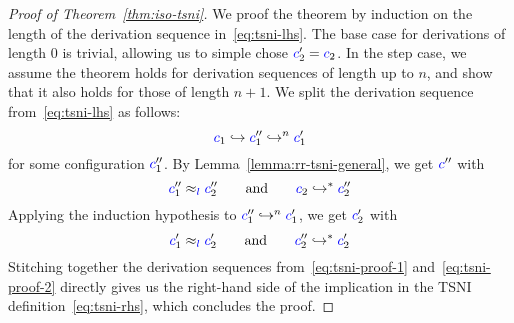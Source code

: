 \documentclass{sigplanconf}
\begin{document}
\begin{proof}[Proof of Theorem~\ref{thm:iso-tsni}]
  We proof the theorem by induction on the length of the derivation sequence in~\eqref{eq:tsni-lhs}.
  The base case for derivations
  of length 0 is trivial, allowing
  us to simple chose ${\color{blue} c}_{2}'\mathrel{=}{\color{blue} c}_{2}$.  In the step case, we assume
  the theorem holds for derivation sequences of length up to $n$, and show that it also
  holds for those of length $n+1$.  We split the derivation sequence from~\eqref{eq:tsni-lhs} as follows:
  \[
  {\color{blue} c}_{1} \hookrightarrow {\color{blue} c}_{1}'' \hookrightarrow^n {\color{blue} c}_{1}'
  \]
  for some configuration \ensuremath{\ifc{c}_{1}''}.  By Lemma~\ref{lemma:rr-tsni-general}, we get
  \ensuremath{\ifc{c}''} with
  \begin{equation} \label{eq:tsni-proof-1}
  {\color{blue} c}_{1}'' \approx_{{\color{blue} l}} {\color{blue} c}_{2}''
  \qquad \text{and} \qquad
  {\color{blue} c}_{2} \hookrightarrow^* {\color{blue} c}_{2}''
  \end{equation}
  Applying the induction hypothesis to
  ${\color{blue} c}_{1}'' \hookrightarrow^n {\color{blue} c}_{1}'$, we get \ensuremath{\ifc{c}_{2}'} with
  \begin{equation} \label{eq:tsni-proof-2}
  {\color{blue} c}_{1}' \approx_{{\color{blue} l}} {\color{blue} c}_{2}'
  \qquad \text{and} \qquad
  {\color{blue} c}_{2}'' \hookrightarrow^* {\color{blue} c}_{2}'
  \end{equation}
  Stitching together the derivation sequences from~\eqref{eq:tsni-proof-1} and~\eqref{eq:tsni-proof-2} directly gives
  us the right-hand side of the implication in the TSNI
  definition~\eqref{eq:tsni-rhs}, which concludes the proof.
\end{proof}
\end{document}
